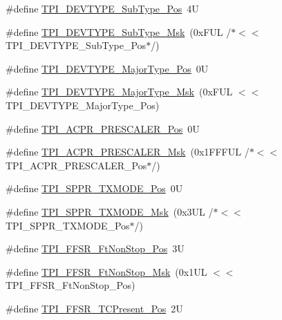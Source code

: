 \begin{DoxyCompactItemize}
\item 
\#define \hyperlink{group___c_m_s_i_s___t_p_i_ga0c799ff892af5eb3162d152abc00af7a}{T\+P\+I\+\_\+\+D\+E\+V\+T\+Y\+P\+E\+\_\+\+Sub\+Type\+\_\+\+Pos}~4U
\item 
\#define \hyperlink{group___c_m_s_i_s___t_p_i_ga5b2fd7dddaf5f64855d9c0696acd65c1}{T\+P\+I\+\_\+\+D\+E\+V\+T\+Y\+P\+E\+\_\+\+Sub\+Type\+\_\+\+Msk}~(0x\+F\+U\+L /$\ast$$<$$<$ T\+P\+I\+\_\+\+D\+E\+V\+T\+Y\+P\+E\+\_\+\+Sub\+Type\+\_\+\+Pos$\ast$/)
\item 
\#define \hyperlink{group___c_m_s_i_s___t_p_i_ga69c4892d332755a9f64c1680497cebdd}{T\+P\+I\+\_\+\+D\+E\+V\+T\+Y\+P\+E\+\_\+\+Major\+Type\+\_\+\+Pos}~0U
\item 
\#define \hyperlink{group___c_m_s_i_s___t_p_i_gaecbceed6d08ec586403b37ad47b38c88}{T\+P\+I\+\_\+\+D\+E\+V\+T\+Y\+P\+E\+\_\+\+Major\+Type\+\_\+\+Msk}~(0x\+F\+U\+L $<$$<$ T\+P\+I\+\_\+\+D\+E\+V\+T\+Y\+P\+E\+\_\+\+Major\+Type\+\_\+\+Pos)
\item 
\#define \hyperlink{group___c_m_s_i_s___t_p_i_ga5a82d274eb2df8b0c92dd4ed63535928}{T\+P\+I\+\_\+\+A\+C\+P\+R\+\_\+\+P\+R\+E\+S\+C\+A\+L\+E\+R\+\_\+\+Pos}~0U
\item 
\#define \hyperlink{group___c_m_s_i_s___t_p_i_ga4fcacd27208419929921aec8457a8c13}{T\+P\+I\+\_\+\+A\+C\+P\+R\+\_\+\+P\+R\+E\+S\+C\+A\+L\+E\+R\+\_\+\+Msk}~(0x1\+F\+F\+F\+U\+L /$\ast$$<$$<$ T\+P\+I\+\_\+\+A\+C\+P\+R\+\_\+\+P\+R\+E\+S\+C\+A\+L\+E\+R\+\_\+\+Pos$\ast$/)
\item 
\#define \hyperlink{group___c_m_s_i_s___t_p_i_ga0f302797b94bb2da24052082ab630858}{T\+P\+I\+\_\+\+S\+P\+P\+R\+\_\+\+T\+X\+M\+O\+D\+E\+\_\+\+Pos}~0U
\item 
\#define \hyperlink{group___c_m_s_i_s___t_p_i_gaca085c8a954393d70dbd7240bb02cc1f}{T\+P\+I\+\_\+\+S\+P\+P\+R\+\_\+\+T\+X\+M\+O\+D\+E\+\_\+\+Msk}~(0x3\+U\+L /$\ast$$<$$<$ T\+P\+I\+\_\+\+S\+P\+P\+R\+\_\+\+T\+X\+M\+O\+D\+E\+\_\+\+Pos$\ast$/)
\item 
\#define \hyperlink{group___c_m_s_i_s___t_p_i_ga9537b8a660cc8803f57cbbee320b2fc8}{T\+P\+I\+\_\+\+F\+F\+S\+R\+\_\+\+Ft\+Non\+Stop\+\_\+\+Pos}~3U
\item 
\#define \hyperlink{group___c_m_s_i_s___t_p_i_gaaa313f980974a8cfc7dac68c4d805ab1}{T\+P\+I\+\_\+\+F\+F\+S\+R\+\_\+\+Ft\+Non\+Stop\+\_\+\+Msk}~(0x1\+U\+L $<$$<$ T\+P\+I\+\_\+\+F\+F\+S\+R\+\_\+\+Ft\+Non\+Stop\+\_\+\+Pos)
\item 
\#define \hyperlink{group___c_m_s_i_s___t_p_i_gad30fde0c058da2ffb2b0a213be7a1b5c}{T\+P\+I\+\_\+\+F\+F\+S\+R\+\_\+\+T\+C\+Present\+\_\+\+Pos}~2U

\end{DoxyCompactItemize}
